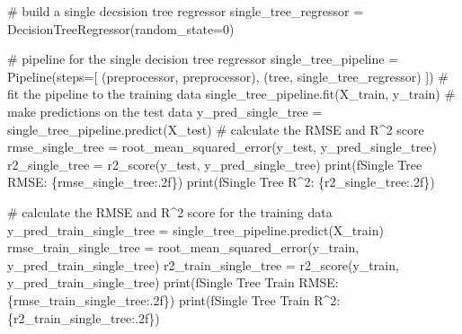 \documentclass[
  letterpaper,
  DIV=11,
  numbers=noendperiod]{scrreprt}
\newenvironment{Shaded}{\begin{snugshade}}{\end{snugshade}}
\newcommand{\BuiltInTok}[1]{\textcolor[rgb]{0.00,0.23,0.31}{#1}}
\newcommand{\CommentTok}[1]{\textcolor[rgb]{0.37,0.37,0.37}{#1}}
\newcommand{\DecValTok}[1]{\textcolor[rgb]{0.68,0.00,0.00}{#1}}
\newcommand{\NormalTok}[1]{\textcolor[rgb]{0.00,0.23,0.31}{#1}}
\newcommand{\OperatorTok}[1]{\textcolor[rgb]{0.37,0.37,0.37}{#1}}
\newcommand{\SpecialCharTok}[1]{\textcolor[rgb]{0.37,0.37,0.37}{#1}}
\newcommand{\SpecialStringTok}[1]{\textcolor[rgb]{0.13,0.47,0.30}{#1}}
\newcommand{\StringTok}[1]{\textcolor[rgb]{0.13,0.47,0.30}{#1}}
\begin{document}
\begin{Shaded}
\begin{Highlighting}[]
\CommentTok{\# build a single decsision tree regressor}
\NormalTok{single\_tree\_regressor }\OperatorTok{=}\NormalTok{ DecisionTreeRegressor(random\_state}\OperatorTok{=}\DecValTok{0}\NormalTok{)}

\CommentTok{\# pipeline for the single decision tree regressor}
\NormalTok{single\_tree\_pipeline }\OperatorTok{=}\NormalTok{ Pipeline(steps}\OperatorTok{=}\NormalTok{[}
\NormalTok{    (}\StringTok{\textquotesingle{}preprocessor\textquotesingle{}}\NormalTok{, preprocessor),}
\NormalTok{    (}\StringTok{\textquotesingle{}tree\textquotesingle{}}\NormalTok{, single\_tree\_regressor)}
\NormalTok{])}
\CommentTok{\# fit the pipeline to the training data}
\NormalTok{single\_tree\_pipeline.fit(X\_train, y\_train)}
\CommentTok{\# make predictions on the test data}
\NormalTok{y\_pred\_single\_tree }\OperatorTok{=}\NormalTok{ single\_tree\_pipeline.predict(X\_test)}
\CommentTok{\# calculate the RMSE and R\^{}2 score}
\NormalTok{rmse\_single\_tree }\OperatorTok{=}\NormalTok{ root\_mean\_squared\_error(y\_test, y\_pred\_single\_tree)}
\NormalTok{r2\_single\_tree }\OperatorTok{=}\NormalTok{ r2\_score(y\_test, y\_pred\_single\_tree)}
\BuiltInTok{print}\NormalTok{(}\SpecialStringTok{f\textquotesingle{}Single Tree RMSE: }\SpecialCharTok{\{}\NormalTok{rmse\_single\_tree}\SpecialCharTok{:.2f\}}\SpecialStringTok{\textquotesingle{}}\NormalTok{)}
\BuiltInTok{print}\NormalTok{(}\SpecialStringTok{f\textquotesingle{}Single Tree R\^{}2: }\SpecialCharTok{\{}\NormalTok{r2\_single\_tree}\SpecialCharTok{:.2f\}}\SpecialStringTok{\textquotesingle{}}\NormalTok{)}

\CommentTok{\# calculate the RMSE and R\^{}2 score for the training data}
\NormalTok{y\_pred\_train\_single\_tree }\OperatorTok{=}\NormalTok{ single\_tree\_pipeline.predict(X\_train)}
\NormalTok{rmse\_train\_single\_tree }\OperatorTok{=}\NormalTok{ root\_mean\_squared\_error(y\_train, y\_pred\_train\_single\_tree)}
\NormalTok{r2\_train\_single\_tree }\OperatorTok{=}\NormalTok{ r2\_score(y\_train, y\_pred\_train\_single\_tree)}
\BuiltInTok{print}\NormalTok{(}\SpecialStringTok{f\textquotesingle{}Single Tree Train RMSE: }\SpecialCharTok{\{}\NormalTok{rmse\_train\_single\_tree}\SpecialCharTok{:.2f\}}\SpecialStringTok{\textquotesingle{}}\NormalTok{)}
\BuiltInTok{print}\NormalTok{(}\SpecialStringTok{f\textquotesingle{}Single Tree Train R\^{}2: }\SpecialCharTok{\{}\NormalTok{r2\_train\_single\_tree}\SpecialCharTok{:.2f\}}\SpecialStringTok{\textquotesingle{}}\NormalTok{)}
\end{Highlighting}
\end{Shaded}
\end{document}
